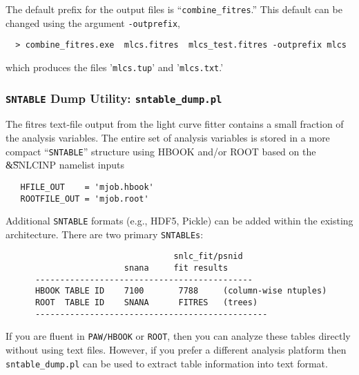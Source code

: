 \documentclass[12pt]{article}
\newcommand{\sndump}{{\tt sntable\_dump.pl}}
\begin{document}
{The default prefix for the output files is ``{\tt combine\_fitres}.''
This default can be changed using the argument {\tt -outprefix},
\begin{verbatim}
  > combine_fitres.exe  mlcs.fitres  mlcs_test.fitres -outprefix mlcs
\end{verbatim}
which produces the files '{\tt mlcs.tup}' and '{\tt mlcs.txt}.'


  \subsubsection{{\tt SNTABLE} Dump Utility: {\sndump} }
  \label{sss:sntable_dump}

The fitres text-file output from the light curve fitter
contains a small fraction of the analysis variables.
The entire set of analysis variables is stored in a more
compact ``{\tt SNTABLE}'' structure using HBOOK and/or ROOT
based on the {\t\&SNLCINP} namelist inputs 
\begin{verbatim}
   HFILE_OUT    = 'mjob.hbook'
   ROOTFILE_OUT = 'mjob.root'
\end{verbatim} 
%
Additional {\tt SNTABLE} formats (e.g., HDF5, Pickle)
can be added within the existing architecture.
There are two primary {\tt SNTABLEs}:
%
\begin{verbatim}
                                  snlc_fit/psnid
                        snana     fit results
      --------------------------------------------
      HBOOK TABLE ID    7100       7788     (column-wise ntuples)
      ROOT  TABLE ID    SNANA      FITRES   (trees)
      -----------------------------------------------
\end{verbatim} 
%
If you are fluent in {\tt PAW/HBOOK} or {\tt ROOT},
then you can analyze these tables directly without
using text files. However, if you prefer a different
analysis platform then {\sndump} can be used to
extract table information into text format.

}
\end{document}
